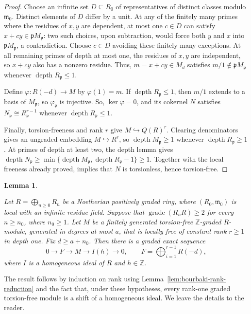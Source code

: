 \documentclass[11pt,letterpaper]{amsart}
\DeclareMathOperator{\dep}{depth}
\theoremstyle{plain}
\newtheorem{lem}[thm]{Lemma}
\theoremstyle{definition}
\theoremstyle{remark}
\begin{document}
\begin{proof}
Choose an infinite set $D\subseteq R_0$ of representatives of
distinct classes modulo $\mathfrak m_0$. Distinct elements of
$D$ differ by a unit. At any of the finitely many primes where
the residues of $x,y$ are dependent, at most one $c\in D$ can
satisfy $x+cy\in\mathfrak pM_{\mathfrak p}$: two such choices,
upon subtraction, would force both $y$ and $x$ into
$\mathfrak pM_{\mathfrak p}$, a contradiction. Choose $c\in D$
avoiding these finitely many exceptions. At all remaining primes
of depth at most one, the residues of $x,y$ are independent,
so $x+cy$ also has a nonzero residue. Thus, $m=x+cy\in M_d$
satisfies $m/1\notin\mathfrak pM_{\mathfrak p}$ whenever
$\dep R_{\mathfrak p}\le1$.

Define $\varphi:R(-d)\to M$ by $\varphi(1)=m$.
If $\dep R_{\mathfrak p}\le1$, then $m/1$ extends to a basis
of $M_{\mathfrak p}$, so $\varphi_{\mathfrak p}$ is injective. So, $\ker\varphi=0$, and its cokernel $N$ satisfies
$N_{\mathfrak p}\cong R_{\mathfrak p}^{r-1}$
whenever $\dep R_{\mathfrak p}\le1$.

Finally, torsion-freeness and rank $r$ give
$M\hookrightarrow Q(R)^r$. Clearing denominators gives
an ungraded embedding $M\hookrightarrow R^r$, so
$\operatorname{depth}M_{\mathfrak p}\geq 1$ whenever
$\operatorname{depth}R_{\mathfrak p}\geq 1$. At primes
of depth at least two, the depth lemma gives $\operatorname{depth}N_{\mathfrak p}
\geq
\min\{\operatorname{depth}M_{\mathfrak p},
      \operatorname{depth}R_{\mathfrak p}-1\}
\geq 1.$ Together with the local freeness already proved, \cite[Proposition~1.4.1(a)]{bruns1998cohen} implies that $N$ is
torsionless, hence torsion-free.
\end{proof}

\begin{lem}
\label{lem:graded-bourbaki}\label{existenseofbasicelements}\label{gradedbasicelements}

Let $R=\bigoplus_{n\ge0}R_n$ be a Noetherian positively graded ring,
where $(R_0,\mathfrak m_0)$ is local with an infinite residue field.
Suppose that $\operatorname{grade}(R_nR)\ge2$ for every $n\ge n_0$,
where $n_0\ge1$.
Let $M$ be a
finitely generated torsion-free $\mathbb Z$-graded $R$-module, generated in degrees
at most $a$, that is locally free of constant rank $r\geq1$ in depth
one. Fix $d\geq a+n_0$.  Then there is a graded exact
sequence
\[
0\longrightarrow F\longrightarrow M\longrightarrow I(h)
\longrightarrow0,
\qquad F=\bigoplus_{i=1}^{r-1}R(-d),
\]
where $I$ is a homogeneous ideal of $R$ and $h\in\mathbb Z$.
\end{lem}
The result follows by induction on rank using Lemma~\ref{lem:bourbaki-rank-reduction} and the fact that, under these hypotheses, every rank-one graded torsion-free module is a shift of a homogeneous ideal.
We leave the details to the reader.
\end{document}
